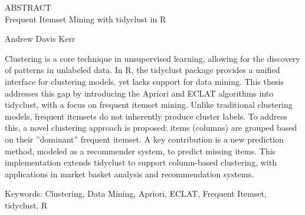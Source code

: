 \begin{center}
ABSTRACT \\
Frequent Itemset Mining with tidyclust in R

Andrew Davis Kerr
\end{center}

Clustering is a core technique in unsupervised learning, allowing for the discovery of patterns
in unlabeled data. In R, the tidyclust package provides a unified interface for clustering
models, yet lacks support for data mining. This thesis addresses this gap by introducing
the Apriori and ECLAT algorithms into tidyclust, with a focus on frequent itemset mining.
Unlike traditional clustering models, frequent itemsets do not inherently produce cluster
labels. To address this, a novel clustering approach is proposed: items (columns) are
grouped based on their ”dominant” frequent itemset. A key contribution is a new prediction
method, modeled as a recommender system, to predict missing items. This implementation
extends tidyclust to support column-based clustering, with applications in market basket
analysis and recommendation systems.

Keywords: Clustering, Data Mining, Apriori, ECLAT, Frequent Itemset, tidyclust, R
\clearpage